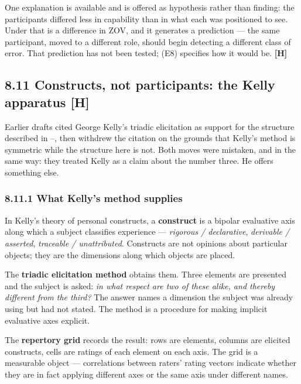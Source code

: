 One explanation is available and is offered as hypothesis rather than finding: the participants differed less in capability than in what each was positioned to see. Under  that is a difference in ZOV, and it generates a prediction — the same participant, moved to a different role, should begin detecting a different class of error. That prediction has not been tested;  (E8) specifies how it would be. \textbf{[H]}


\subsection*{8.11 Constructs, not participants: the Kelly apparatus \textbf{[H]}}
\label{sec:en:8.11}

Earlier drafts cited George Kelly's triadic elicitation as support for the structure described in –, then withdrew the citation on the grounds that Kelly's method is symmetric while the structure here is not. Both moves were mistaken, and in the same way: they treated Kelly as a claim about the number three. He offers something else.


\subsubsection*{8.11.1 What Kelly's method supplies}
\label{sec:en:8.11.1}

In Kelly's theory of personal constructs, a \textbf{construct} is a bipolar evaluative axis along which a subject classifies experience — \emph{rigorous / declarative}, \emph{derivable / asserted}, \emph{traceable / unattributed}. Constructs are not opinions about particular objects; they are the dimensions along which objects are placed.

The \textbf{triadic elicitation method} obtains them. Three elements are presented and the subject is asked: \emph{in what respect are two of these alike, and thereby different from the third?} The answer names a dimension the subject was already using but had not stated. The method is a procedure for making implicit evaluative axes explicit.

The \textbf{repertory grid} records the result: rows are elements, columns are elicited constructs, cells are ratings of each element on each axis. The grid is a measurable object — correlations between raters' rating vectors indicate whether they are in fact applying different axes or the same axis under different names.


